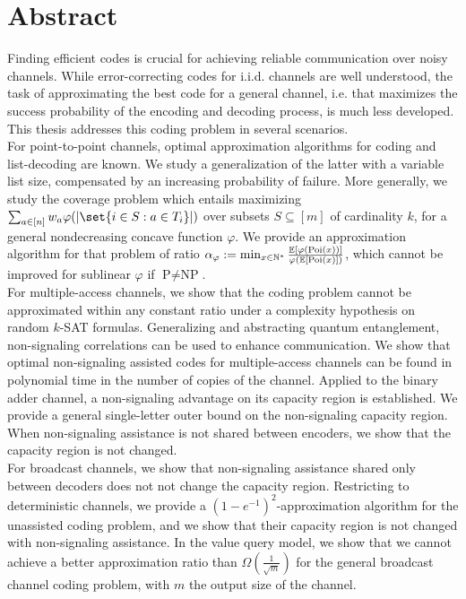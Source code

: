 \chapter*{Abstract}
Finding efficient codes is crucial for achieving reliable communication over noisy channels. While error-correcting codes for i.i.d. channels are well understood, the task of approximating the best code for a general channel, i.e. that maximizes the success probability of the encoding and decoding process, is much less developed. This thesis addresses this coding problem in several scenarios.\vspace{2mm}\\
For point-to-point channels, optimal approximation algorithms for coding and list-decoding are known. We study a generalization of the latter with a variable list size, compensated by an increasing probability of failure. More generally, we study the coverage problem which entails maximizing $\sum_{a \in [n]} w_a \varphi(\abs{\set{i \in S : a \in T_i}})$ over subsets $S \subseteq [m]$ of cardinality $k$, for a general nondecreasing concave function $\varphi$. We provide an approximation algorithm for that problem of ratio $\alpha_{\varphi} := \min_{x \in \mathbb{N}^*} \frac{\mathbb{E}[\varphi(\operatorname{\text{Poi}}(x))]}{\varphi(\mathbb{E}[\operatorname{\text{Poi}}(x)])}$, which cannot be improved for sublinear $\varphi$ if $\textrm{P}\not=\textrm{NP}$.\vspace{2mm}\\
For multiple-access channels, we show that the coding problem cannot be approximated within any constant ratio under a complexity hypothesis on random $k$-SAT formulas. Generalizing and abstracting quantum entanglement, non-signaling correlations can be used to enhance communication. We show that optimal non-signaling assisted codes for multiple-access channels can be found in polynomial time in the number of copies of the channel. Applied to the binary adder channel, a non-signaling advantage on its capacity region is established. We provide a general single-letter outer bound on the non-signaling capacity region. When non-signaling assistance is not shared between encoders, we show that the capacity region is not changed.\vspace{2mm}\\
For broadcast channels, we show that non-signaling assistance shared only between decoders does not not change the capacity region. Restricting to deterministic channels, we provide a $(1-e^{-1})^2$-approximation algorithm for the unassisted coding problem, and we show that their capacity region is not changed with non-signaling assistance. In the value query model, we show that we cannot achieve a better approximation ratio than $\Omega\left(\frac{1}{\sqrt{m}}\right)$ for the general broadcast channel coding problem, with $m$ the output size of the channel.

